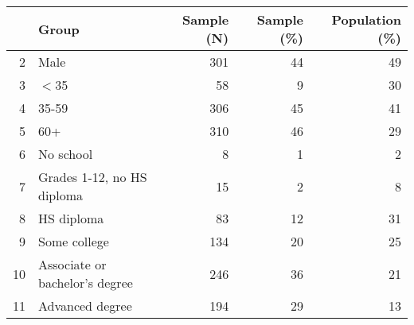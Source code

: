 \begin{table}[ht]
\centering
\begin{tabular}{rlrrr}
  \hline
 & Group & Sample (N) & Sample (\%) & Population (\%) \\ 
  \hline
2 & Male & 301 & 44 & 49 \\ 
  3 & $<$35 & 58 & 9 & 30 \\ 
  4 & 35-59 & 306 & 45 & 41 \\ 
  5 & 60+ & 310 & 46 & 29 \\ 
  6 & No school & 8 & 1 & 2 \\ 
  7 & Grades 1-12, no HS diploma & 15 & 2 & 8 \\ 
  8 & HS diploma & 83 & 12 & 31 \\ 
  9 & Some college & 134 & 20 & 25 \\ 
  10 & Associate or bachelor's degree & 246 & 36 & 21 \\ 
  11 & Advanced degree & 194 & 29 & 13 \\ 
   \hline
\end{tabular}
\end{table}
